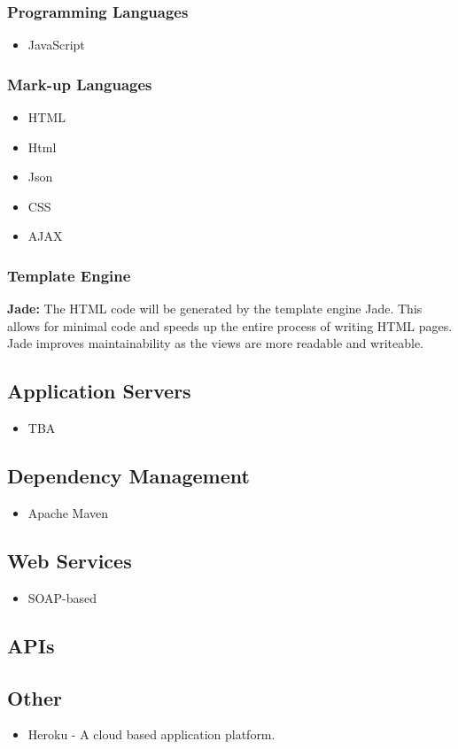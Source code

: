 \subsubsection{Programming Languages}
\begin{itemize}
	\item JavaScript	
\end{itemize}

\subsubsection{Mark-up Languages}
\begin{itemize}
	\item HTML
	\item Html
	\item Json
	\item CSS
	\item AJAX
\end{itemize}

\subsubsection{Template Engine}
\textbf{Jade:} The HTML code will be generated by the template engine Jade. This allows for minimal code and speeds up the entire process of writing HTML pages. Jade improves maintainability as the views are more readable and writeable.


\subsection{Application Servers}
\begin{itemize}
	\item TBA
\end{itemize}

\subsection{Dependency Management}
\begin{itemize}
	\item Apache Maven
\end{itemize}

\subsection{Web Services}
\begin{itemize}
	\item SOAP-based
\end{itemize} 

\subsection{APIs}
\subsection{Other}
\begin{itemize}
	\item Heroku - A cloud based application platform.
\end{itemize}





